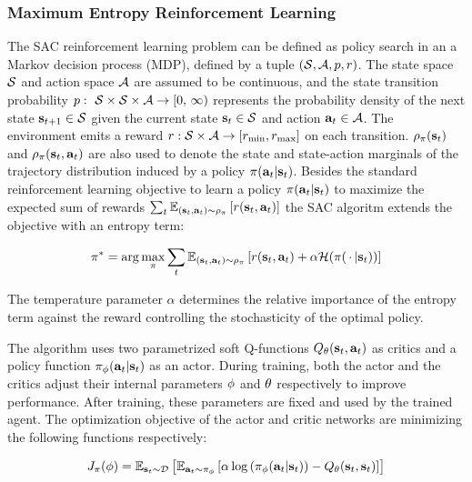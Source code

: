 \documentclass[a4paper, fleqn]{cas-dc}
\begin{document}
	\subsubsection{Maximum Entropy Reinforcement Learning}
	The SAC reinforcement learning problem can be defined as policy search in an a Markov decision process (MDP), defined by a tuple $(\mathcal{S}, \mathcal{A}, p, r)$. The state space $\mathcal{S}$ and action space $\mathcal{A}$ are assumed to be continuous, and the state transition probability $\pdyn:\ \sspace \times \sspace \times \aspace \rightarrow [0,\, \infty)$ represents the probability density of the next state ${\mathbf{s}_{t+1}}\in\mathcal{S}$ given the current state ${\mathbf{s}_t}\in\mathcal{S}$ and action ${\mathbf{a}_t}\in\mathcal{A}$. The environment emits a reward $r: \mathcal{S} \times \mathcal{A} \rightarrow  [r_\mathrm{min},r_\mathrm{max}]$ on each transition. $\rho_\pi({\mathbf{s}_t})$ and $\rho_\pi({\mathbf{s}_t},{\mathbf{a}_t})$ are also used to denote the state and state-action marginals of the trajectory distribution induced by a policy $\pi({\mathbf{a}_t}|{\mathbf{s}_t})$.  Besides the standard reinforcement learning objective to learn a policy $\pi({\mathbf{a}_t}|{\mathbf{s}_t})$ to maximize the expected sum of rewards $\sum_t \operatorname{\mathbb{E}}_{({\mathbf{s}_t},{\mathbf{a}_t})\sim\rho_\pi}\left[r({\mathbf{s}_t},{\mathbf{a}_t})\right]$ the SAC algoritm extends the objective with an entropy term:
	
	\begin{align}
		\label{eq:sql:maxent_objective}
		\pi^* = \arg\max_{\pi} \sum_{t} \operatorname{\mathbb{E}}_{({\mathbf{s}_t}, {\mathbf{a}_t}) \sim \rho_\pi}\left[r({\mathbf{s}_t},{\mathbf{a}_t}) + \alpha\mathcal{H}(\pi({\,\cdot\,}|{\mathbf{s}_t}))\right]
	\end{align}
	
	The temperature parameter $\alpha$ determines the relative importance of the entropy term against the reward controlling the stochasticity of the optimal policy.
	
	The algorithm uses two parametrized soft Q-functions $Q_\theta({\mathbf{s}_t}, {\mathbf{a}_t})$ as critics and a policy function  $\pi_{\phi}({\mathbf{a}_t}|{\mathbf{s}_t})$ as an actor. During training, both the actor and the critics adjust their internal parameters ${\phi}$ and $\theta$ respectively to improve performance. After training, these parameters are fixed and used by the trained agent. The optimization objective of the actor and critic networks are minimizing the following functions respectively:
	
	\begin{align}
		J_\pi({\phi}) = \operatorname{\mathbb{E}}_{{\mathbf{s}_t}\sim\mathcal{D}}\left[\operatorname{\mathbb{E}}_{{\mathbf{a}_t}\sim\pi_{\phi}}\left[\alpha \log\left(\pi_{\phi}({\mathbf{a}_t}|{\mathbf{s}_t})\right) - Q_\theta({\mathbf{s}_t}, {\mathbf{s}_t})\right]\right]
	\end{align}
	
\end{document}
